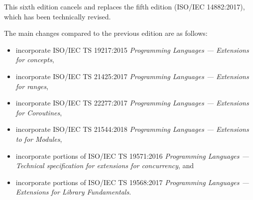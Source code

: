 This sixth edition cancels and replaces the fifth edition
(ISO/IEC 14882:2017), which has been technically revised.

The main changes compared to the previous edition are as follows:

\begin{itemize}
\item incorporate ISO/IEC TS 19217:2015 \textit{Programming Languages --- \Cpp{} Extensions for concepts},
\item incorporate ISO/IEC TS 21425:2017 \textit{Programming Languages --- \Cpp{} Extensions for ranges},
\item incorporate ISO/IEC TS 22277:2017 \textit{Programming Languages --- \Cpp{} Extensions for Coroutines},
\item incorporate ISO/IEC TS 21544:2018 \textit{Programming Languages --- Extensions to \Cpp{} for Modules},
\item incorporate portions of ISO/IEC TS 19571:2016 \textit{Programming Languages --- Technical specification for \Cpp{} extensions for concurrency}, and %
\item incorporate portions of ISO/IEC TS 19568:2017 \textit{Programming Languages --- \Cpp{} Extensions for Library Fundamentals}.


\end{itemize}
